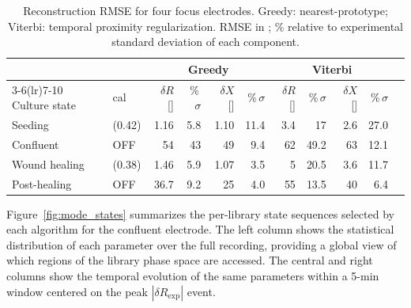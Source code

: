 \documentclass[english, 10pt, a4paper]{article}
\def\si#1{#1}%
\newcommand{\dR}{\ensuremath{\delta R}}
\newcommand{\dX}{\ensuremath{\delta X}}
\begin{document}
\begin{table}[H]
  \centering
  \caption{Reconstruction RMSE for four focus electrodes. Greedy: nearest-prototype; Viterbi: temporal proximity regularization. RMSE in \si{\ohm}; \% relative to experimental standard deviation of each component.}
  \label{tab:rmse}
  \small
  \begin{tabular}{llrrrrrrrrr}
  \toprule
   & & \multicolumn{4}{c}{Greedy} & \multicolumn{4}{c}{Viterbi} \\
  \cmidrule(lr){3-6}\cmidrule(lr){7-10}
  Culture state & cal & $\dR$ [\si{\ohm}] & \%\,$\sigma$ & $\dX$ [\si{\ohm}] & \%\,$\sigma$ & $\dR$ [\si{\ohm}] & \%\,$\sigma$ & $\dX$ [\si{\ohm}] & \%\,$\sigma$ \\
  \midrule
  Seeding        & (0.42) & 1.16 & 5.8  & 1.10 & 11.4 & 3.4  & 17   & 2.6  & 27.0 \\
  Confluent      & OFF    & 54   & 43   & 49   &  9.4 & 62   & 49.2 & 63   & 12.1 \\
  Wound healing  & (0.38) & 1.46 & 5.9  & 1.07 &  3.5 & 5    & 20.5 & 3.6  & 11.7 \\
  Post-healing   & OFF    & 36.7 & 9.2  & 25   &  4.0 & 55   & 13.5 & 40   &  6.4 \\
  \bottomrule
  \end{tabular}
\end{table}

Figure~\ref{fig:mode_states} summarizes the per-library state sequences selected by each algorithm for the confluent electrode. The left column shows the statistical distribution of each parameter over the full recording, providing a global view of which regions of the library phase space are accessed. The central and right columns show the temporal evolution of the same parameters within a 5-min window centered on the peak $|\dR_{\mathrm{exp}}|$ event.
\end{document}
